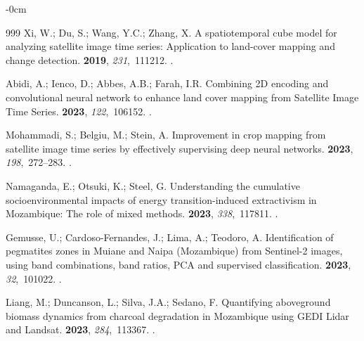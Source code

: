 \documentclass[coasts,article,accept,pdftex,oneauthor]{Definitions/mdpi}
\begin{document}
\begin{adjustwidth}{-\extralength}{0cm}
\begin{thebibliography}{999}
Xi, W.; Du, S.; Wang, Y.C.; Zhang, X.
\newblock A spatiotemporal cube model for analyzing satellite image time
  series: Application to land-cover mapping and change detection.
 {\bf 2019}, {\em 231},~111212.
.

Abidi, A.; Ienco, D.; Abbes, A.B.; Farah, I.R.
\newblock Combining 2D encoding and convolutional neural network to enhance
  land cover mapping from Satellite Image Time Series.
 {\bf 2023},
  {\em 122},~106152.
.

Mohammadi, S.; Belgiu, M.; Stein, A.
\newblock Improvement in crop mapping from satellite image time series by
  effectively supervising deep neural networks.
 {\bf 2023},
  {\em 198},~272--283.
.

Namaganda, E.; Otsuki, K.; Steel, G.
\newblock Understanding the cumulative socioenvironmental impacts of energy
  transition-induced extractivism in Mozambique: The role of mixed methods.
 {\bf 2023}, {\em
  338},~117811.
.

Gemusse, U.; Cardoso-Fernandes, J.; Lima, A.; Teodoro, A.
\newblock Identification of pegmatites zones in Muiane and Naipa (Mozambique)
  from Sentinel-2 images, using band combinations, band ratios, PCA and
  supervised classification.
 {\bf
  2023}, {\em 32},~101022.
.

Liang, M.; Duncanson, L.; Silva, J.A.; Sedano, F.
\newblock Quantifying aboveground biomass dynamics from charcoal degradation in
  Mozambique using GEDI Lidar and Landsat.
 {\bf 2023}, {\em 284},~113367.
.


\end{thebibliography}
\end{adjustwidth}
\end{document}
